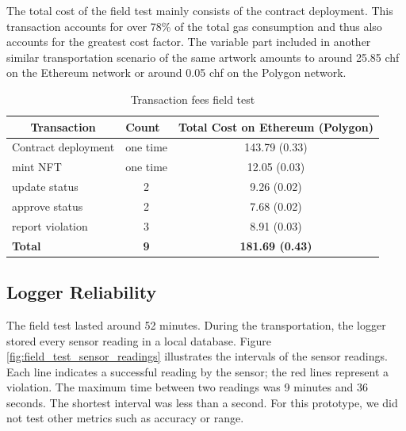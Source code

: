 The total cost of the field test mainly consists of the contract deployment. This transaction accounts for over 78\% of the total gas consumption and thus also accounts for the greatest cost factor. The variable part included in another similar transportation scenario of the same artwork amounts to around 25.85 \gls{chf} on the Ethereum network or around 0.05 \gls{chf} on the Polygon network.

\begin{table}[ht]
\centering
\begin{tabular}{lcc}
\multicolumn{1}{c}{\textbf{Transaction}} & \multicolumn{1}{l}{\textbf{Count}} & \multicolumn{1}{c}{\textbf{Total Cost on Ethereum (Polygon)}} \\ \hline
Contract deployment                      & one time                           & 143.79 (0.33)          \\
mint NFT                                 & one time                           & 12.05 (0.03)           \\
update status                            & 2                                  & 9.26 (0.02)            \\
approve status                           & 2                                  & 7.68 (0.02)            \\
report violation                         & 3                                  & 8.91 (0.03)            \\ \hline
\textbf{Total}                           & \textbf{9}                         & \textbf{181.69 (0.43)} \\
\hline
\end{tabular}
\caption{Transaction fees field test}
\label{tab:field_test_tx_fees}
\end{table}
\vspace{-0.5cm}
\subsection{Logger Reliability}
The field test lasted around 52 minutes. During the transportation, the logger stored every sensor reading in a local database. Figure \ref{fig:field_test_sensor_readings} illustrates the intervals of the sensor readings. Each line indicates a successful reading by the sensor; the red lines represent a violation. The maximum time between two readings was 9 minutes and 36 seconds. The shortest interval was less than a second. For this prototype, we did not test other metrics such as accuracy or range.


